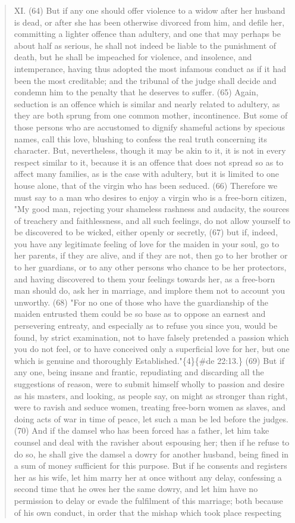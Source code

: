 \documentclass[11pt]{article}
\begin{document}
\begin{quote}
XI. (64) But if any one should offer violence to a widow after her husband is dead, or after she has been otherwise divorced from him, and defile her, committing a lighter offence than adultery, and one that may perhaps be about half as serious, he shall not indeed be liable to the punishment of death, but he shall be impeached for violence, and insolence, and intemperance, having thus adopted the most infamous conduct as if it had been the most creditable; and the tribunal of the judge shall decide and condemn him to the penalty that he deserves to suffer. (65) Again, seduction is an offence which is similar and nearly related to adultery, as they are both sprung from one common mother, incontinence. But some of those persons who are accustomed to dignify shameful actions by specious names, call this love, blushing to confess the real truth concerning its character. But, nevertheless, though it may be akin to it, it is not in every respect similar to it, because it is an offence that does not spread so as to affect many families, as is the case with adultery, but it is limited to one house alone, that of the virgin who has been seduced. (66) Therefore we must say to a man who desires to enjoy a virgin who is a free-born citizen, "My good man, rejecting your shameless rashness and audacity, the sources of treachery and faithlessness, and all such feelings, do not allow yourself to be discovered to be wicked, either openly or secretly, (67) but if, indeed, you have any legitimate feeling of love for the maiden in your soul, go to her parents, if they are alive, and if they are not, then go to her brother or to her guardians, or to any other persons who chance to be her protectors, and having discovered to them your feelings towards her, as a free-born man should do, ask her in marriage, and implore them not to account you unworthy. (68) "For no one of those who have the guardianship of the maiden entrusted them could be so base as to oppose an earnest and persevering entreaty, and especially as to refuse you since you, would be found, by strict examination, not to have falsely pretended a passion which you do not feel, or to have conceived only a superficial love for her, but one which is genuine and thoroughly Established."\{4\}\{\#de 22:13.\} (69) But if any one, being insane and frantic, repudiating and discarding all the suggestions of reason, were to submit himself wholly to passion and desire as his masters, and looking, as people say, on might as stronger than right, were to ravish and seduce women, treating free-born women as slaves, and doing acts of war in time of peace, let such a man be led before the judges. (70) And if the damsel who has been forced has a father, let him take counsel and deal with the ravisher about espousing her; then if he refuse to do so, he shall give the damsel a dowry for another husband, being fined in a sum of money sufficient for this purpose. But if he consents and registers her as his wife, let him marry her at once without any delay, confessing a second time that he owes her the same dowry, and let him have no permission to delay or evade the fulfilment of this marriage; both because of his own conduct, in order that the mishap which took place respecting 
\end{quote}
\end{document}
